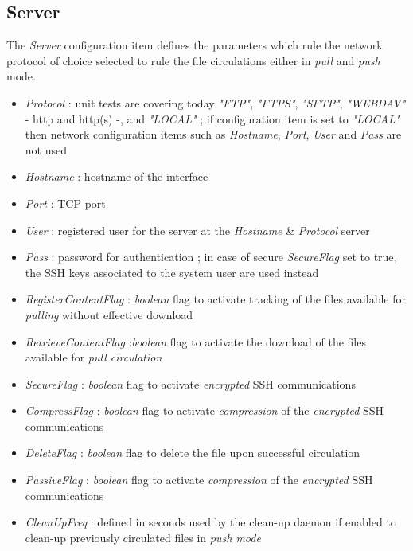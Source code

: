 \documentclass[dec_sum_main.tex]{subfiles}
\begin{document}
\subsection{Server}
The \textit{Server} configuration item defines the parameters which rule the network protocol of choice selected to rule the file circulations either in \textit{pull} and \textit{push} mode.
\par
\noindent
\label{Config_Server}
\begin{itemize}
	\item \textit{Protocol} : unit tests are covering today \textit{"FTP"}, \textit{"FTPS"}, \textit{"SFTP"}, \textit{"WEBDAV"} - http and http(s) -, and\textit{ "LOCAL"} ; if configuration item is set to \textit{"LOCAL"} then network configuration items such as \textit{Hostname}, \textit{Port}, \textit{User} and \textit{Pass} are not used   
	\item \textit{Hostname} : hostname of the interface
	\item \textit{Port} : TCP port
	\item \textit{User} : registered user for the server at the \textit{Hostname} \& \textit{Protocol} server
	\item \textit{Pass} : password for authentication ; in case of secure \textit{SecureFlag} set to true, the SSH keys associated to the system user are used instead
	\item \textit{RegisterContentFlag} : \textit{boolean} flag to activate tracking of the files available for \textit{pulling} without effective download
	\item \textit{RetrieveContentFlag} :\textit{boolean} flag to activate the download of the files available for \textit{pull circulation} 
	\item \textit{SecureFlag} : \textit{boolean} flag to activate \textit{encrypted} SSH communications
	\item \textit{CompressFlag} : \textit{boolean} flag to activate \textit{compression} of the \textit{encrypted} SSH communications
	\label{DeleteFlag}
	\item \textit{DeleteFlag} : \textit{boolean} flag to delete the file upon successful circulation
	\item \textit{PassiveFlag} : \textit{boolean} flag to activate \textit{compression} of the \textit{encrypted} SSH communications
	\item \textit{CleanUpFreq} : defined in seconds used by the clean-up daemon if enabled to clean-up previously circulated files in \textit{push mode}	
\end{itemize}
\end{document}
